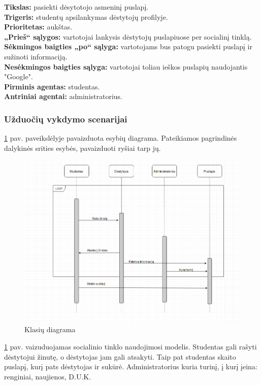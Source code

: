 \documentclass{VUMIFPSkursinis}
\begin{document}
\textbf{Tikslas:} pasiekti dėsytotojo asmeninį puslapį.\\
\textbf{Trigeris:} studentų apsilankymas dėstytojų profilyje. \\
\textbf{Prioritetas:} aukštas. \\
\textbf{„Prieš“ sąlygos:} vartotojai lankysis dėstytojų puslapiuose per socialinį tinklą.\\
\textbf{Sėkmingos baigties „po“ sąlyga:} vartotojams bus patogu pasiekti puslapį ir sužinoti informaciją. \\
\textbf{Nesėkmingos baigties sąlyga:} vartotojai toliau ieškos puslapių naudojantis "Google". \\
\textbf{Pirminis agentas:} studentas. \\
\textbf{Antriniai agentai:} administratorius.

\subsubsection{Užduočių vykdymo scenarijai}
\ref{fig:klasiu} pav. paveikslėlyje pavaizduota esybių diagrama. Pateikiamos pagrindinės dalykinės srities esybės, pavaizduoti ryšiai tarp jų.
\begin{figure}[H]
\includegraphics[width=\linewidth]{img/bendra-uml.png}
\caption{Klasių diagrama}
\label{fig:klasiu}
\end{figure}
\ref{fig:klasiu} pav. vaizuduojamas socialinio tinklo naudojimosi modelis. Studentas gali rašyti dėstytojui žinutę, o dėstytojas jam gali atsakyti. Taip pat studentas skaito puslapį, kurį pats dėstytojas ir sukūrė. Administratorius kuria turinį, į kurį įeina: renginiai, naujienos, D.U.K.
\end{document}
